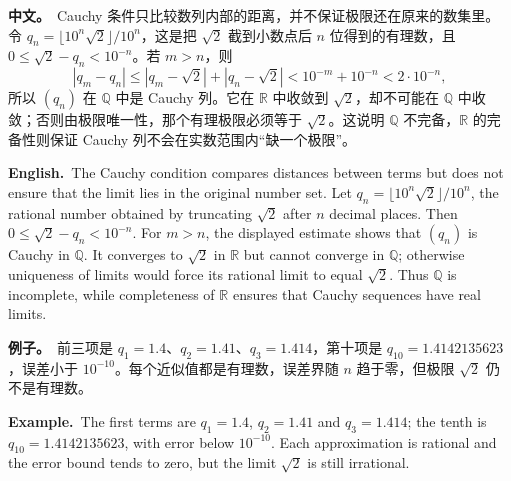 \documentclass[UTF8,11pt,a4paper]{ctexart}
\newcommand{\BOTH}[2]{\par\noindent\textbf{中文。}\ #1\par\noindent\textbf{English.}\ #2\par}
\newcommand{\EX}[2]{\par\noindent\textbf{例子。}\ #1\par\noindent\textbf{Example.}\ #2\par}
\begin{document}
\BOTH{Cauchy 条件只比较数列内部的距离，并不保证极限还在原来的数集里。令 $q_n=\lfloor10^n\sqrt2\rfloor/10^n$，这是把 $\sqrt2$ 截到小数点后 $n$ 位得到的有理数，且 $0\le\sqrt2-q_n<10^{-n}$。若 $m>n$，则
\[
|q_m-q_n|\le |q_m-\sqrt2|+|q_n-\sqrt2|<10^{-m}+10^{-n}<2\cdot10^{-n},
\]
所以 $(q_n)$ 在 $\mathbb Q$ 中是 Cauchy 列。它在 $\mathbb R$ 中收敛到 $\sqrt2$，却不可能在 $\mathbb Q$ 中收敛；否则由极限唯一性，那个有理极限必须等于 $\sqrt2$。这说明 $\mathbb Q$ 不完备，$\mathbb R$ 的完备性则保证 Cauchy 列不会在实数范围内“缺一个极限”。}{The Cauchy condition compares distances between terms but does not ensure that the limit lies in the original number set. Let $q_n=\lfloor10^n\sqrt2\rfloor/10^n$, the rational number obtained by truncating $\sqrt2$ after $n$ decimal places. Then $0\le\sqrt2-q_n<10^{-n}$. For $m>n$, the displayed estimate shows that $(q_n)$ is Cauchy in $\mathbb Q$. It converges to $\sqrt2$ in $\mathbb R$ but cannot converge in $\mathbb Q$; otherwise uniqueness of limits would force its rational limit to equal $\sqrt2$. Thus $\mathbb Q$ is incomplete, while completeness of $\mathbb R$ ensures that Cauchy sequences have real limits.}
\EX{前三项是 $q_1=1.4$、$q_2=1.41$、$q_3=1.414$，第十项是 $q_{10}=1.4142135623$，误差小于 $10^{-10}$。每个近似值都是有理数，误差界随 $n$ 趋于零，但极限 $\sqrt2$ 仍不是有理数。}{The first terms are $q_1=1.4$, $q_2=1.41$ and $q_3=1.414$; the tenth is $q_{10}=1.4142135623$, with error below $10^{-10}$. Each approximation is rational and the error bound tends to zero, but the limit $\sqrt2$ is still irrational.}
\end{document}
